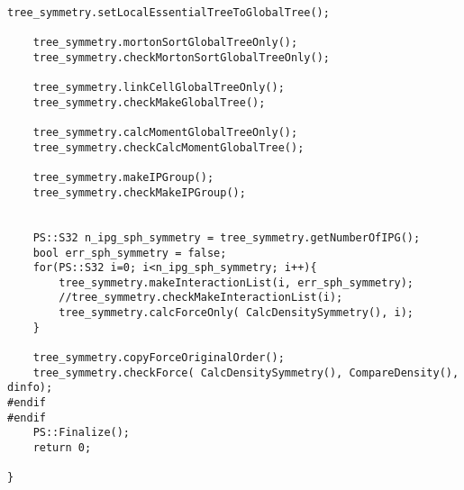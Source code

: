 \begin{lstlisting}[caption=開放境界、モートンソート、ローカルツリー構築、モーメント計算、LET交換、グローバルツリー構築、相互作用計算のテスト]
    tree_symmetry.setLocalEssentialTreeToGlobalTree();

    tree_symmetry.mortonSortGlobalTreeOnly();
    tree_symmetry.checkMortonSortGlobalTreeOnly();

    tree_symmetry.linkCellGlobalTreeOnly();
    tree_symmetry.checkMakeGlobalTree();

    tree_symmetry.calcMomentGlobalTreeOnly();
    tree_symmetry.checkCalcMomentGlobalTree();

    tree_symmetry.makeIPGroup();
    tree_symmetry.checkMakeIPGroup();


    PS::S32 n_ipg_sph_symmetry = tree_symmetry.getNumberOfIPG();
    bool err_sph_symmetry = false;
    for(PS::S32 i=0; i<n_ipg_sph_symmetry; i++){
        tree_symmetry.makeInteractionList(i, err_sph_symmetry);
        //tree_symmetry.checkMakeInteractionList(i);
        tree_symmetry.calcForceOnly( CalcDensitySymmetry(), i);
    }

    tree_symmetry.copyForceOriginalOrder();
    tree_symmetry.checkForce( CalcDensitySymmetry(), CompareDensity(), dinfo);
#endif
#endif
    PS::Finalize();
    return 0;

}


\end{lstlisting}